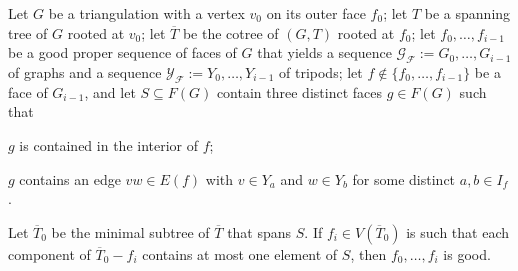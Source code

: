 \documentclass{patmorin}
\begin{document}

\begin{lem}\label{lca_sperner}
  Let $G$ be a triangulation with a vertex $v_0$ on its outer face $f_0$; let $T$ be a spanning tree of $G$ rooted at $v_0$; let $\overline{T}$ be the cotree of $(G,T)$ rooted at $f_0$; let $f_0,\ldots,f_{i-1}$ be a good proper sequence of faces of $G$ that yields a sequence $\mathcal{G}_\mathcal{F}:=G_0,\ldots,G_{i-1}$ of graphs and a sequence $\mathcal{Y}_\mathcal{F}:=Y_0,\ldots,Y_{i-1}$ of tripods; let $f\not\in \{f_0,\ldots,f_{i-1}\}$ be a face of $G_{i-1}$, and let $S\subseteq F(G)$ contain three distinct faces $g\in F(G)$ such that
  \begin{compactenum}[(i)]
      \item $g$ is contained in the interior of $f$;
      \item $g$ contains an edge $vw\in E(f)$ with $v\in Y_a$ and $w\in Y_b$ for some distinct $a,b\in I_f$.
  \end{compactenum}
  Let $\overline{T}_0$ be the minimal subtree of $\overline{T}$ that spans $S$.  If $f_i\in V(\overline{T}_0)$ is such that each component of $\overline{T}_0-f_i$ contains at most one element of $S$, then $f_0,\ldots,f_i$ is good.
\end{lem}
\end{document}
